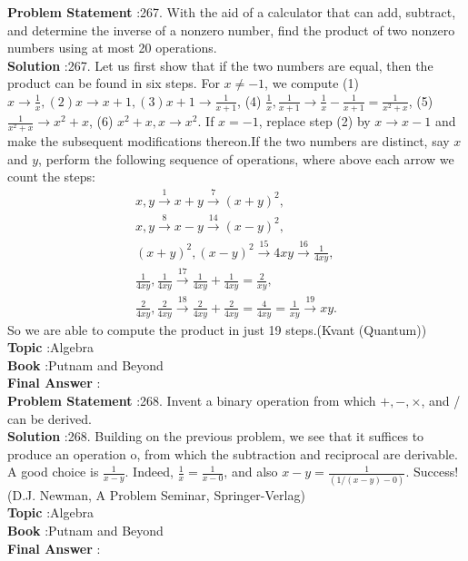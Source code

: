 \documentclass[10pt]{article}
\begin{document}
\textbf{Problem Statement} :267. With the aid of a calculator that can add, subtract, and determine the inverse of a nonzero number, find the product of two nonzero numbers using at most 20 operations.\\
\textbf{Solution} :267. Let us first show that if the two numbers are equal, then the product can be found in six steps. For $x \neq-1$, we compute (1) $x \rightarrow \frac{1}{x},(2) x \rightarrow x+1,(3) x+1 \rightarrow \frac{1}{x+1}$, (4) $\frac{1}{x}, \frac{1}{x+1} \rightarrow \frac{1}{x}-\frac{1}{x+1}=\frac{1}{x^{2}+x}$, (5) $\frac{1}{x^{2}+x} \rightarrow x^{2}+x$, (6) $x^{2}+x, x \rightarrow x^{2}$. If $x=-1$, replace step (2) by $x \rightarrow x-1$ and make the subsequent modifications thereon.If the two numbers are distinct, say $x$ and $y$, perform the following sequence of operations, where above each arrow we count the steps:$$ \begin{gathered} x, y \stackrel{1}{\longrightarrow} x+y \stackrel{7}{\longrightarrow}(x+y)^{2}, \\ x, y \stackrel{8}{\longrightarrow} x-y \stackrel{14}{\longrightarrow}(x-y)^{2}, \\ (x+y)^{2},(x-y)^{2} \stackrel{15}{\longrightarrow} 4 x y \stackrel{16}{\longrightarrow} \frac{1}{4 x y}, \\ \frac{1}{4 x y}, \frac{1}{4 x y} \stackrel{17}{\longrightarrow} \frac{1}{4 x y}+\frac{1}{4 x y}=\frac{2}{x y}, \\ \frac{2}{4 x y}, \frac{2}{4 x y} \stackrel{18}{\longrightarrow} \frac{2}{4 x y}+\frac{2}{4 x y}=\frac{4}{4 x y}=\frac{1}{x y} \stackrel{19}{\longrightarrow} x y . \end{gathered} $$So we are able to compute the product in just 19 steps.(Kvant (Quantum))\\
\textbf{Topic} :Algebra\\
\textbf{Book} :Putnam and Beyond\\
\textbf{Final Answer} :\\


\textbf{Problem Statement} :268. Invent a binary operation from which $+,-, \times$, and / can be derived.\\
\textbf{Solution} :268. Building on the previous problem, we see that it suffices to produce an operation o, from which the subtraction and reciprocal are derivable. A good choice is $\frac{1}{x-y}$. Indeed, $\frac{1}{x}=\frac{1}{x-0}$, and also $x-y=\frac{1}{(1 /(x-y)-0)}$. Success!(D.J. Newman, A Problem Seminar, Springer-Verlag) \\
\textbf{Topic} :Algebra\\
\textbf{Book} :Putnam and Beyond\\
\textbf{Final Answer} :\\
\end{document}
